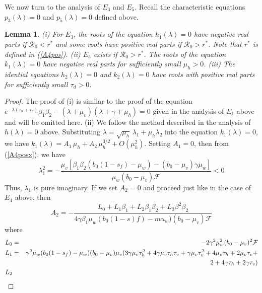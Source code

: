 \documentclass[12pt,leqno]{article}
\newtheorem{Lemma}[Theorem]{Lemma}%
\begin{document}
We now turn to the analysis of $E_3$ and $E_5$. Recall the characteristic equations $p_3(\lambda)=0$ and $p_5(\lambda)=0$ defined above. 
\begin{Lemma}\label{E3E5}
(i) For $E_3$, the roots of the equation $h_1(\lambda)=0$ have negative real parts if $\mathcal{R}_0 < r^*$ and some roots have positive real parts if $\mathcal{R}_0 > r^*$. Note that $r^*$ is defined in (\ref{A4pos}). (ii) $E_5$ exists if $\mathcal{R}_0 > r^*$. The roots of the equation $k_1(\lambda)=0$ have negative real parts for sufficiently small $\mu_h>0$. (iii) The idential equations $h_2(\lambda)=0$ and $k_2(\lambda)=0$ have roots with positive real parts for sufficiently small $\tau_d>0$.
\end{Lemma}
\begin{proof}
The proof of (i) is similar to the proof of the equation $e^{-\lambda(\tau_h+\tau_v)}\beta_1\beta_2 - (\lambda+\mu_v)(\lambda+\gamma+\mu_h)=0$ given in the analysis of $E_1$ above and will be omitted here. (ii) We follow the method described in the analysis of $h(\lambda)=0$ above. Substituting $\lambda = \sqrt{\mu_h}\,\lambda_1 + \mu_h \lambda_2$ into the equation $k_1(\lambda) = 0$, we have $k_1(\lambda) = A_1\,\mu_h + A_2\,\mu_h^{3/2} + O(\mu_h^2).$ Setting $A_1=0$, then from (\ref{A4posx}), we have
\begin{equation*}
\lambda_1^2 = -\frac{\mu_v [\beta_1\beta_2(b_0(1-s_f)-\mu_w) - (b_0-\mu_v)\gamma\mu_w]}{\mu_w(b_0-\mu_v)\mathcal{F}} < 0
\end{equation*} 
Thus, $\lambda_1$ is pure imaginary. If we set $A_2 = 0$ and proceed just like in the case of $E_4$ above, then 
\begin{equation*}
A_2 = -\frac{L_0 + L_1\beta_1 + L_2\beta_1\beta_2 + L_3\beta^2\beta_2}{4\gamma\beta_1\mu_w(b_0(1-s)f)-mu_w)(b_0-\mu_v)\mathcal{F}} 
\end{equation*}
where
\begin{eqnarray*}
L_0 %
&=& -2\gamma^2\mu_w^2(b_0-\mu_v)^2\mathcal{F}\\
L_1 &=& \gamma^2\mu_w(b_0(1-s_f)-\mu_w)(b_0-\mu_v)\mu_v(3\gamma\mu_v\tau_h^2+4\gamma\mu_v\tau_h\tau_v+\gamma\mu_v\tau_v^2+4\mu_v\tau_h+2\mu_v\tau_v+\\
&&\hspace{2.5in} 2+4\gamma\tau_h+2\gamma\tau_v)\\
L_2 %

\end{eqnarray*}
\end{proof}
\end{document}
